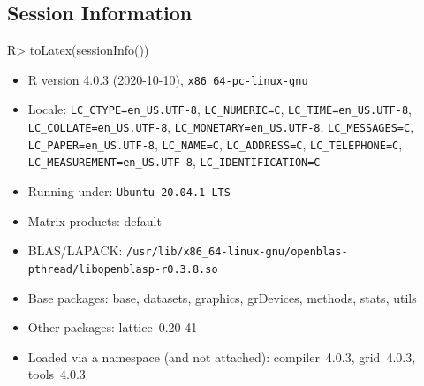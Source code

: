\documentclass{article}
\begin{document}
\subsection*{Session Information}

\begin{Schunk}
\begin{Sinput}
R> toLatex(sessionInfo())
\end{Sinput}
\begin{itemize}\raggedright
  \item R version 4.0.3 (2020-10-10), \verb|x86_64-pc-linux-gnu|
  \item Locale: \verb|LC_CTYPE=en_US.UTF-8|, \verb|LC_NUMERIC=C|, \verb|LC_TIME=en_US.UTF-8|, \verb|LC_COLLATE=en_US.UTF-8|, \verb|LC_MONETARY=en_US.UTF-8|, \verb|LC_MESSAGES=C|, \verb|LC_PAPER=en_US.UTF-8|, \verb|LC_NAME=C|, \verb|LC_ADDRESS=C|, \verb|LC_TELEPHONE=C|, \verb|LC_MEASUREMENT=en_US.UTF-8|, \verb|LC_IDENTIFICATION=C|
  \item Running under: \verb|Ubuntu 20.04.1 LTS|
  \item Matrix products: default
  \item BLAS/LAPACK: \verb|/usr/lib/x86_64-linux-gnu/openblas-pthread/libopenblasp-r0.3.8.so|
  \item Base packages: base, datasets, graphics, grDevices,
    methods, stats, utils
  \item Other packages: lattice~0.20-41
  \item Loaded via a namespace (and not attached):
    compiler~4.0.3, grid~4.0.3, tools~4.0.3
\end{itemize}\end{Schunk}
\end{document}
